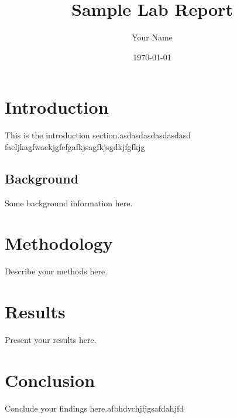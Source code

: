 \documentclass[11pt]{article}
\title{Sample Lab Report} \author{Your Name} \date{\today}
\begin{document}
\maketitle

\section{Introduction} This is the introduction section.asdasdasdasdasdasd faeljkagfwaekjgfefgafkjsagfkjsgdkjfgfkjg

\subsection{Background} Some background information here.

\section{Methodology} Describe your methods here.

\section{Results} Present your results here.

\section{Conclusion} Conclude your findings here.afbhdvchjfjgsafdahjfd
\end{document}
